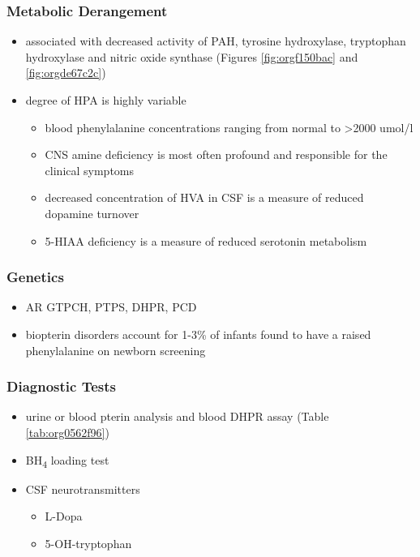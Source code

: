\documentclass[12pt]{scrartcl}
\begin{document}
\subsubsection{Metabolic Derangement}
\label{sec:orgf5b4005}
\begin{itemize}
\item associated with decreased activity of PAH, tyrosine hydroxylase,
tryptophan hydroxylase and nitric oxide synthase (Figures \ref{fig:orgf150bac}
and \ref{fig:orgde67c2c})
\item degree of HPA is highly variable
\begin{itemize}
\item blood phenylalanine concentrations ranging from normal to \textgreater{}2000
umol/l
\item CNS amine deficiency is most often profound and responsible for
the clinical symptoms
\item decreased concentration of HVA in CSF is a measure of reduced
dopamine turnover
\item 5-HIAA deficiency is a measure of reduced serotonin metabolism
\end{itemize}
\end{itemize}

\subsubsection{Genetics}
\label{sec:orgf887ada}
\begin{itemize}
\item AR GTPCH, PTPS, DHPR, PCD
\item biopterin disorders account for 1-3\% of infants found to have a
raised phenylalanine on newborn screening
\end{itemize}

\subsubsection{Diagnostic Tests}
\label{sec:orgfe94f25}
\begin{itemize}
\item urine or blood pterin analysis and blood DHPR assay (Table \ref{tab:org0562f96})
\item BH\textsubscript{4} loading test
\item CSF neurotransmitters
\begin{itemize}
\item L-Dopa
\item 5-OH-tryptophan
\end{itemize}
\end{itemize}
\end{document}
